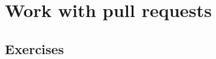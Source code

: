 \section{Work with pull requests}
\begin{frame}[fragile]
    \slidetitle
\end{frame}

\subsection{Exercises}
\begin{frame}[fragile]
  \subslidetitle
\end{frame}
